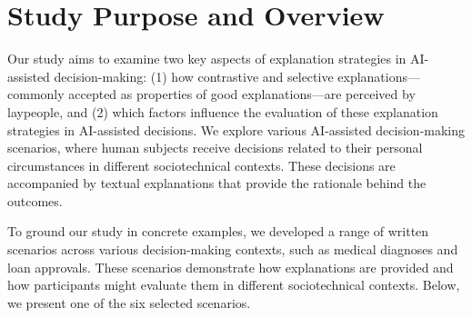 \section{Study Purpose and Overview}
Our study aims to examine two key aspects of explanation strategies in AI-assisted decision-making: (1) how contrastive and selective explanations—commonly accepted as properties of good explanations—are perceived by laypeople, and (2) which factors influence the evaluation of these explanation strategies in AI-assisted decisions. We explore various AI-assisted decision-making scenarios, where human subjects receive decisions related to their personal circumstances in different sociotechnical contexts. These decisions are accompanied by textual explanations that provide the rationale behind the outcomes.

To ground our study in concrete examples, we developed a range of written scenarios across various decision-making contexts, such as medical diagnoses and loan approvals. These scenarios demonstrate how explanations are provided and how participants might evaluate them in different sociotechnical contexts. Below, we present one of the six selected scenarios.


